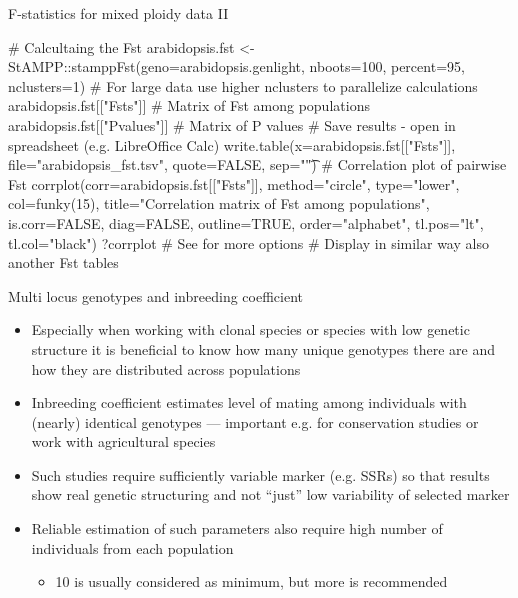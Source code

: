 \documentclass[compress, xelatex, 11pt, xcolor=svgnames, aspectratio=169,
	hyperref={
		bookmarks=true,
		unicode=true,
		colorlinks=true,
		pdftitle={Molecular data in R},
		plainpages=false,
		pdfauthor={Vojtech Zeisek},
		pdfsubject={Course about phylogeny and evolution in R},
		pdfcreator={XeLaTeX},
		pdfkeywords={R, evolution, phylogeny, molecular data},
		linkcolor=Crimson, %
		anchorcolor=Magenta, %
		citecolor=Magenta, %
		filecolor=Magenta, %
		menucolor=Magenta, %
		urlcolor=DodgerBlue, %
		},
	url={hyphens, lowtilde} %
	]{beamer}
\begin{document}
\begin{frame}[fragile]{F-statistics for mixed ploidy data II}
	\begin{spluscode}
    # Calcultaing the Fst
    arabidopsis.fst <- StAMPP::stamppFst(geno=arabidopsis.genlight,
      nboots=100, percent=95, nclusters=1)
    # For large data use higher nclusters to parallelize calculations
    arabidopsis.fst[["Fsts"]] # Matrix of Fst among populations
    arabidopsis.fst[["Pvalues"]] # Matrix of P values
    # Save results - open in spreadsheet (e.g. LibreOffice Calc)
    write.table(x=arabidopsis.fst[["Fsts"]], file="arabidopsis_fst.tsv",
      quote=FALSE, sep="\t")
    # Correlation plot of pairwise Fst
    corrplot(corr=arabidopsis.fst[["Fsts"]], method="circle", type="lower",
      col=funky(15), title="Correlation matrix of Fst among populations",
      is.corr=FALSE, diag=FALSE, outline=TRUE, order="alphabet", tl.pos="lt",
      tl.col="black")
    ?corrplot # See for more options
    # Display in similar way also another Fst tables
	\end{spluscode}
\end{frame}

\begin{frame}{Multi locus genotypes and inbreeding coefficient}
	\begin{itemize}
		\item Especially when working with clonal species or species with low genetic structure it is beneficial to know how many unique genotypes there are and how they are distributed across populations
		\item Inbreeding coefficient estimates level of mating among individuals with (nearly) identical genotypes --- important e.g. for conservation studies or work with agricultural species
		\item Such studies require sufficiently variable marker (e.g. SSRs) so that results show real genetic structuring and not \enquote{just} low variability of selected marker
		\item Reliable estimation of such parameters also require high number of individuals from each population
		\begin{itemize}
			\item 10 is usually considered as minimum, but more is recommended
		\end{itemize}
	\end{itemize}
\end{frame}
\end{document}
